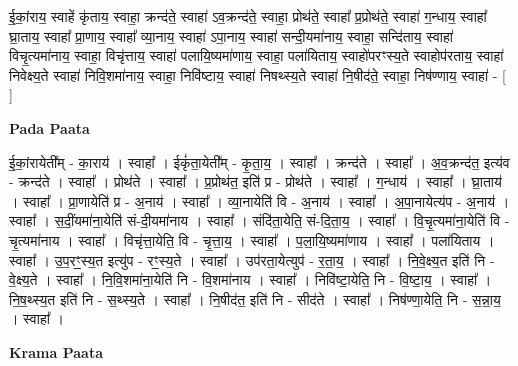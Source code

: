 \documentclass[17pt]{extarticle}
\begin{document}
ई॒कां॒राय॒ स्वाहें कृ॑ताय॒ स्वाहा॒ क्रन्द॑ते॒ स्वाहा॑ ऽव॒क्रन्द॑ते॒ स्वाहा॒ प्रोथ॑ते॒ स्वाहा᳚ प्र॒प्रोथ॑ते॒ स्वाहा॑ ग॒न्धाय॒ स्वाहा᳚ घ्रा॒ताय॒ स्वाहा᳚ प्रा॒णाय॒ स्वाहा᳚ व्या॒नाय॒ स्वाहा॑ ऽपा॒नाय॒ स्वाहा॑ सन्दी॒यमा॑नाय॒ स्वाहा॒ सन्दि॑ताय॒ स्वाहा॑ विचृ॒त्यमा॑नाय॒ स्वाहा॒ विचृ॑त्ताय॒ स्वाहा॑ पलायि॒ष्यमा॑णाय॒ स्वाहा॒ पला॑यिताय॒ स्वाहो॑परꣳस्य॒ते स्वाहोप॑रताय॒ स्वाहा॑ निवेक्ष्य॒ते स्वाहा॑ निवि॒शमा॑नाय॒ स्वाहा॒ निवि॑ष्टाय॒ स्वाहा॑ निषथ्स्य॒ते स्वाहा॑ नि॒षीद॑ते॒ स्वाहा॒ निष॑ण्णाय॒ स्वाहा॑ - [  ] \newline

\textbf{Pada Paata} \newline

ई॒कां॒रायेती᳚म् - का॒राय॑ । स्वाहा᳚ । ईकृं॑ता॒येती᳚म् - कृ॒ता॒य॒ । स्वाहा᳚ । क्रन्द॑ते । स्वाहा᳚ । अ॒व॒क्रन्द॑त॒ इत्य॑व - क्रन्द॑ते । स्वाहा᳚ । प्रोथ॑ते । स्वाहा᳚ । प्र॒प्रोथ॑त॒ इति॑ प्र - प्रोथ॑ते । स्वाहा᳚ । ग॒न्धाय॑ । स्वाहा᳚ । घ्रा॒ताय॑ । स्वाहा᳚ । प्रा॒णायेति॑ प्र - अ॒नाय॑ । स्वाहा᳚ । व्या॒नायेति॑ वि - अ॒नाय॑ । स्वाहा᳚ । अ॒पा॒नायेत्य॑प - अ॒नाय॑ । स्वाहा᳚ । स॒दीं॒यमा॑ना॒येति॑ सं-दी॒यमा॑नाय । स्वाहा᳚ । संदि॑ता॒येति॒ सं-दि॒ता॒य॒ । स्वाहा᳚ । वि॒चृ॒त्यमा॑ना॒येति॑ वि - चृ॒त्यमा॑नाय । स्वाहा᳚ । विचृ॑त्ता॒येति॒ वि - चृ॒त्ता॒य॒ । स्वाहा᳚ । प॒ला॒यि॒ष्यमा॑णाय । स्वाहा᳚ । पला॑यिताय । स्वाहा᳚ । उ॒प॒रꣳ॒॒स्य॒त इत्यु॑प - रꣳ॒॒स्य॒ते । स्वाहा᳚ । उप॑रता॒येत्युप॑ - र॒ता॒य॒ । स्वाहा᳚ । नि॒वे॒क्ष्य॒त इति॑ नि - वे॒क्ष्य॒ते । स्वाहा᳚ । नि॒वि॒शमा॑ना॒येति॑ नि - वि॒शमा॑नाय । स्वाहा᳚ । निवि॑ष्टा॒येति॒ नि - वि॒ष्टा॒य॒ । स्वाहा᳚ । नि॒ष॒थ्स्य॒त इति॑ नि - स॒थ्स्य॒ते । स्वाहा᳚ । नि॒षीद॑त॒ इति॑ नि - सीद॑ते । स्वाहा᳚ । निष॑ण्णा॒येति॒ नि - स॒न्ना॒य॒ । स्वाहा᳚ ।  \newline


\textbf{Krama Paata} \newline
\end{document}
